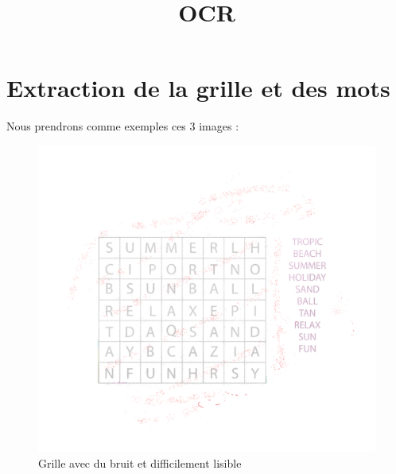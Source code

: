 \documentclass{article}
\title{OCR}
\author{}
\date{}
\begin{document}
\maketitle
\tableofcontents

\newpage



\section{Extraction de la grille et des mots}

Nous prendrons comme exemples ces 3 images :

\begin{figure}[!htb]
      \includegraphics[width=\linewidth]{ressources/image_1.png}
      \caption{Grille avec du bruit et difficilement lisible}
    \endminipage\hfill

\end{figure}
\end{document}
